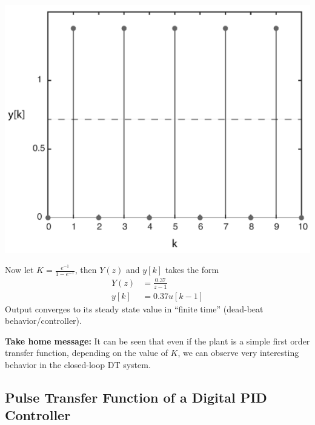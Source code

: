 \documentclass[twoside]{article}
\begin{document}
    \begin{center}
\begin{minipage}[h]{0.5\linewidth}
    \begin{center}
      \includegraphics[width=\textwidth]{oscillate}
    \end{center}
\end{minipage}
    \end{center}
%
Now let $K = \frac{e^{-1}}{1-e^{-1}}$, then $Y(z)$ and $y[k]$
takes the form
%
\begin{align*}
Y(z) &= \frac{0.37}{z-1} 
\\
y[k] &= 0.37 u[k-1]
\end{align*}
%
Output converges to its steady state value in ``finite time''
(dead-beat behavior/controller). 

\textbf{Take home message:} It can be seen that even if the plant is
a simple first order transfer function, depending on the value of $K$,
we can observe very interesting behavior in the closed-loop DT system.

\newpage 

\subsection*{Pulse Transfer Function of a Digital PID Controller}
\end{document}
